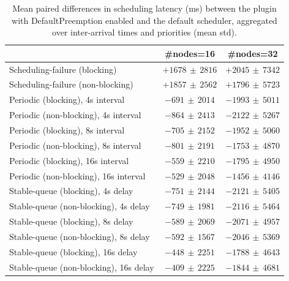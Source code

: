 \begin{table}[t]
\tiny
\setlength{\tabcolsep}{1.2pt}
\renewcommand{\arraystretch}{1.12}
\centering
\caption{Mean paired differences in scheduling latency (ms) between the plugin with DefaultPreemption enabled and the default scheduler, aggregated over inter-arrival times and priorities (mean \pm std).}
\label{tab:latency-defpreempt1-std1-agg-arrival-prio}
\begin{tabular}{l c c}
\toprule
 & \#nodes=16 & \#nodes=32 \\
\midrule
Scheduling-failure (blocking) & $+1678\,\pm\,2816$ & $+2045\,\pm\,7342$ \\
Scheduling-failure (non-blocking) & $+1857\,\pm\,2562$ & $+1796\,\pm\,5723$ \\
Periodic (blocking), 4s interval & $-691\,\pm\,2014$ & $-1993\,\pm\,5011$ \\
Periodic (non-blocking), 4s interval & $-864\,\pm\,2413$ & $-2122\,\pm\,5267$ \\
Periodic (blocking), 8s interval & $-705\,\pm\,2152$ & $-1952\,\pm\,5060$ \\
Periodic (non-blocking), 8s interval & $-801\,\pm\,2191$ & $-1753\,\pm\,4870$ \\
Periodic (blocking), 16s interval & $-559\,\pm\,2210$ & $-1795\,\pm\,4950$ \\
Periodic (non-blocking), 16s interval & $-529\,\pm\,2048$ & $-1456\,\pm\,4146$ \\
Stable-queue (blocking), 4s delay & $-751\,\pm\,2144$ & $-2121\,\pm\,5405$ \\
Stable-queue (non-blocking), 4s delay & $-749\,\pm\,1981$ & $-2116\,\pm\,5464$ \\
Stable-queue (blocking), 8s delay & $-589\,\pm\,2069$ & $-2071\,\pm\,4957$ \\
Stable-queue (non-blocking), 8s delay & $-592\,\pm\,1567$ & $-2046\,\pm\,5369$ \\
Stable-queue (blocking), 16s delay & $-448\,\pm\,2251$ & $-1788\,\pm\,4643$ \\
Stable-queue (non-blocking), 16s delay & $-409\,\pm\,2225$ & $-1844\,\pm\,4681$ \\
\bottomrule
\end{tabular}
\end{table}
